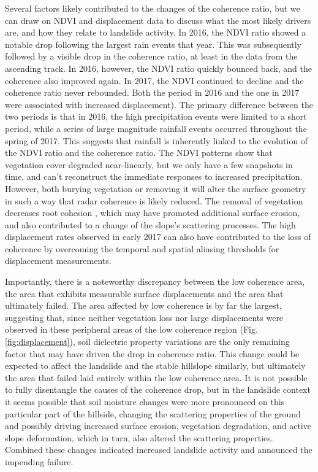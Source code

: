 \documentclass[nhess, manuscript]{copernicus}
\begin{document}
Several factors likely contributed to the changes of the coherence ratio, but we can draw on NDVI and displacement data to discuss what the most likely drivers are, and how they relate to landslide activity. In 2016, the NDVI ratio showed a notable drop following the largest rain events that year. This was subsequently followed by a visible drop in the coherence ratio, at least in the data from the ascending track. In 2016, however, the NDVI ratio quickly bounced back, and the coherence also improved again. In 2017, the NDVI continued to decline and the coherence ratio never rebounded. Both the period in 2016 and the one in 2017 were associated with increased displacement). The primary difference between the two periods is that in 2016, the high precipitation events were limited to a short period, while a series of large magnitude rainfall events occurred throughout the spring of 2017. This suggests that rainfall is inherently linked to the evolution of the NDVI ratio and the coherence ratio. The NDVI patterns show that vegetation cover degraded near-linearly, but we only have a few snapshots in time, and can't reconstruct the immediate responses to increased precipitation. However, both burying vegetation or removing it will alter the surface geometry in such a way that radar coherence is likely reduced. The removal of vegetation decreases root cohesion \citep[e.g.,][]{schmidt2001}, which may have promoted additional surface erosion, and also contributed to a change of the slope's scattering processes. The high displacement rates observed in early 2017 can also have contributed to the loss of coherence by overcoming the temporal and spatial aliasing thresholds for displacement measurements. \par
Importantly, there is a noteworthy discrepancy between the low coherence area, the area that exhibits measurable surface displacements and the area that ultimately failed. The area affected by low coherence is by far the largest, suggesting that, since neither vegetation loss nor large displacements were observed in these peripheral areas of the low coherence region (Fig. \ref{fig:displacement}), soil dielectric property variations are the only remaining factor that may have driven the drop in coherence ratio. This change could be expected to affect the landslide and the stable hillslope similarly, but ultimately the area that failed laid entirely within the low coherence area. It is not possible to fully disentangle the causes of the coherence drop, but in the landslide context it seems possible that soil moisture changes were more pronounced on this particular part of the hillside, changing the scattering properties of the ground and possibly driving increased surface erosion, vegetation degradation, and active slope deformation, which in turn, also altered the scattering properties. Combined these changes indicated increased landslide activity and announced the impending failure. \par
\end{document}

